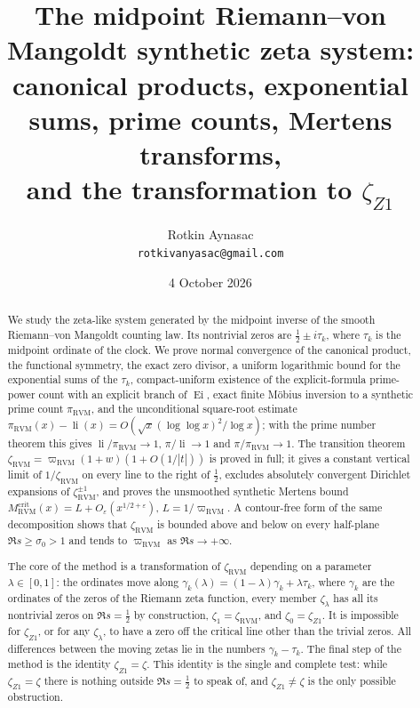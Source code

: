 \documentclass[11pt,reqno]{amsart}
\numberwithin{equation}{section}
\theoremstyle{plain}
\theoremstyle{definition}
\theoremstyle{remark}
\newcommand{\eps}{\varepsilon}
\newcommand{\li}{\operatorname{li}}
\newcommand{\Ei}{\operatorname{Ei}}
\newcommand{\RVM}{\mathrm{RVM}}
\newcommand{\crit}{\mathrm{crit}}
\providecommand{\NoCaseChange}[1]{\lowercase{#1}}
\begin{document}
\title[The midpoint RVM synthetic zeta system]{The midpoint Riemann--von Mangoldt synthetic zeta system:\\
canonical products, exponential sums, prime counts, Mertens transforms,\\
and the transformation to $\zeta_{Z1}$}
\author{Rotkin Aynasac\\[2pt]\NoCaseChange{\normalfont\texttt{rotkivanyasac@gmail.com}}}
\date{4 October 2026}

\begin{abstract}
We study the zeta-like system generated by the midpoint inverse of the smooth Riemann--von Mangoldt counting law.  Its nontrivial zeros are $\tfrac12\pm i\tau_k$, where $\tau_k$ is the midpoint ordinate of the clock.  We prove normal convergence of the canonical product, the functional symmetry, the exact zero divisor, a uniform logarithmic bound for the exponential sums of the $\tau_k$, compact-uniform existence of the explicit-formula prime-power count with an explicit branch of $\Ei$, exact finite M\"obius inversion to a synthetic prime count $\pi_{\RVM}$, and the unconditional square-root estimate $\pi_{\RVM}(x)-\li(x)=O(\sqrt x(\log\log x)^2/\log x)$; with the prime number theorem this gives $\li/\pi_{\RVM}\to1$, $\pi/\li\to1$ and $\pi/\pi_{\RVM}\to1$.  The transition theorem $\zeta_{\RVM}=\varpi_{\RVM}(1+w)(1+O(1/|t|))$ is proved in full; it gives a constant vertical limit of $1/\zeta_{\RVM}$ on every line to the right of $\tfrac12$, excludes absolutely convergent Dirichlet expansions of $\zeta_{\RVM}^{\pm1}$, and proves the unsmoothed synthetic Mertens bound $M_{\RVM}^{\crit}(x)=L+O_\eps(x^{1/2+\eps})$, $L=1/\varpi_{\RVM}$.  A contour-free form of the same decomposition shows that $\zeta_{\RVM}$ is bounded above and below on every half-plane $\Re s\ge\sigma_0>1$ and tends to $\varpi_{\RVM}$ as $\Re s\to+\infty$.

The core of the method is a transformation of $\zeta_{\RVM}$ depending on a parameter $\lambda\in[0,1]$: the ordinates move along $\gamma_k(\lambda)=(1-\lambda)\gamma_k+\lambda\tau_k$, where $\gamma_k$ are the ordinates of the zeros of the Riemann zeta function, every member $\zeta_\lambda$ has all its nontrivial zeros on $\Re s=\tfrac12$ by construction, $\zeta_1=\zeta_{\RVM}$, and $\zeta_0=\zeta_{Z1}$.  It is impossible for $\zeta_{Z1}$, or for any $\zeta_\lambda$, to have a zero off the critical line other than the trivial zeros.  All differences between the moving zetas lie in the numbers $\gamma_k-\tau_k$.  The final step of the method is the identity $\zeta_{Z1}=\zeta$.  This identity is the single and complete test: while $\zeta_{Z1}=\zeta$ there is nothing outside $\Re s=\tfrac12$ to speak of, and $\zeta_{Z1}\neq\zeta$ is the only possible obstruction.


\end{abstract}
\end{document}

